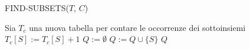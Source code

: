 \begin{algorithm}[H] 
    \caption{FIND-SUBSETS($T$, $C$)}\label{alg:find-subsets}
    \begin{algorithmic}[1]
        \State Sia $T_c$ una nuova tabella per contare le occorrenze dei sottoinsiemi
                \State $T_c[S] := T_c[S] + 1$
            \EndFor
        \EndFor
        \State $Q := \emptyset$
                \State $Q := Q \cup \{S\}$
            \EndIf
        \EndFor
        \State \Return $Q$
    \end{algorithmic}
\end{algorithm}